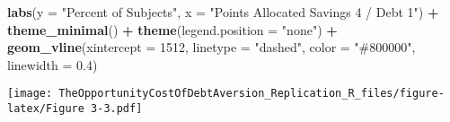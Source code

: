\documentclass[
]{article}
\newenvironment{Shaded}{\begin{snugshade}}{\end{snugshade}}
\newcommand{\AttributeTok}[1]{\textcolor[rgb]{0.13,0.29,0.53}{#1}}
\newcommand{\DecValTok}[1]{\textcolor[rgb]{0.00,0.00,0.81}{#1}}
\newcommand{\FloatTok}[1]{\textcolor[rgb]{0.00,0.00,0.81}{#1}}
\newcommand{\FunctionTok}[1]{\textcolor[rgb]{0.13,0.29,0.53}{\textbf{#1}}}
\newcommand{\NormalTok}[1]{#1}
\newcommand{\SpecialCharTok}[1]{\textcolor[rgb]{0.81,0.36,0.00}{\textbf{#1}}}
\newcommand{\StringTok}[1]{\textcolor[rgb]{0.31,0.60,0.02}{#1}}
\begin{document}
\begin{Shaded}
\begin{Highlighting}[]
  \FunctionTok{labs}\NormalTok{(}\AttributeTok{y =} \StringTok{"Percent of Subjects"}\NormalTok{, }\AttributeTok{x =} \StringTok{"Points Allocated Savings 4 / Debt 1"}\NormalTok{) }\SpecialCharTok{+}
  \FunctionTok{theme\_minimal}\NormalTok{() }\SpecialCharTok{+}
  \FunctionTok{theme}\NormalTok{(}\AttributeTok{legend.position =} \StringTok{"none"}\NormalTok{) }\SpecialCharTok{+}
  \FunctionTok{geom\_vline}\NormalTok{(}\AttributeTok{xintercept =} \DecValTok{1512}\NormalTok{, }\AttributeTok{linetype =} \StringTok{"dashed"}\NormalTok{, }\AttributeTok{color =} \StringTok{"\#800000"}\NormalTok{, }\AttributeTok{linewidth =} \FloatTok{0.4}\NormalTok{)}
\end{Highlighting}
\end{Shaded}

\texttt{[image: TheOpportunityCostOfDebtAversion\_Replication\_R\_files/figure-latex/Figure 3-3.pdf]}
\end{document}
